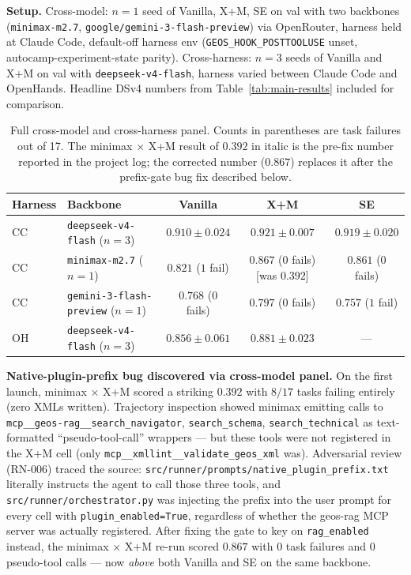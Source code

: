 \documentclass{article}
\begin{document}
\textbf{Setup.} Cross-model: $n=1$ seed of Vanilla, X+M, SE on val with two backbones (\texttt{minimax-m2.7}, \texttt{google/gemini-3-flash-preview}) via OpenRouter, harness held at Claude Code, default-off harness env (\texttt{GEOS\_HOOK\_POSTTOOLUSE} unset, autocamp-experiment-state parity). Cross-harness: $n=3$ seeds of Vanilla and X+M on val with \texttt{deepseek-v4-flash}, harness varied between Claude Code and OpenHands. Headline DSv4 numbers from Table~\ref{tab:main-results} included for comparison.

\begin{table}[h]
  \caption{Full cross-model and cross-harness panel. Counts in parentheses are task failures out of 17. The minimax × X+M result of $0.392$ in italic is the pre-fix number reported in the project log; the corrected number ($0.867$) replaces it after the prefix-gate bug fix described below.}
  \label{tab:cross-cutting-full}
  \centering
  \small
  \begin{tabular}{llccc}
    \toprule
    \textbf{Harness} & \textbf{Backbone} & \textbf{Vanilla} & \textbf{X+M} & \textbf{SE} \\
    \midrule
    CC & \texttt{deepseek-v4-flash} ($n=3$) & $0.910 \pm 0.024$ & $0.921 \pm 0.007$ & $0.919 \pm 0.020$ \\
    CC & \texttt{minimax-m2.7} ($n=1$)        & $0.821$ ($1$ fail) & $0.867$ ($0$ fails) [was $\mathit{0.392}$] & $0.861$ ($0$ fails) \\
    CC & \texttt{gemini-3-flash-preview} ($n=1$) & $0.768$ ($0$ fails) & $0.797$ ($0$ fails) & $0.757$ ($1$ fail) \\
    OH & \texttt{deepseek-v4-flash} ($n=3$) & $0.856 \pm 0.061$ & $0.881 \pm 0.023$ & --- \\
    \bottomrule
  \end{tabular}
\end{table}

\textbf{Native-plugin-prefix bug discovered via cross-model panel.} On the first launch, minimax × X+M scored a striking $0.392$ with $8/17$ tasks failing entirely (zero XMLs written). Trajectory inspection showed minimax emitting calls to \texttt{mcp\_\_geos-rag\_\_search\_navigator}, \texttt{search\_schema}, \texttt{search\_technical} as text-formatted ``pseudo-tool-call'' wrappers --- but these tools were not registered in the X+M cell (only \texttt{mcp\_\_xmllint\_\_validate\_geos\_xml} was). Adversarial review (RN-006) traced the source: \texttt{src/runner/prompts/native\_plugin\_prefix.txt} literally instructs the agent to call those three tools, and \texttt{src/runner/orchestrator.py} was injecting the prefix into the user prompt for every cell with \texttt{plugin\_enabled=True}, regardless of whether the geos-rag MCP server was actually registered. After fixing the gate to key on \texttt{rag\_enabled} instead, the minimax × X+M re-run scored $0.867$ with $0$ task failures and $0$ pseudo-tool calls --- now \emph{above} both Vanilla and SE on the same backbone.
\end{document}
